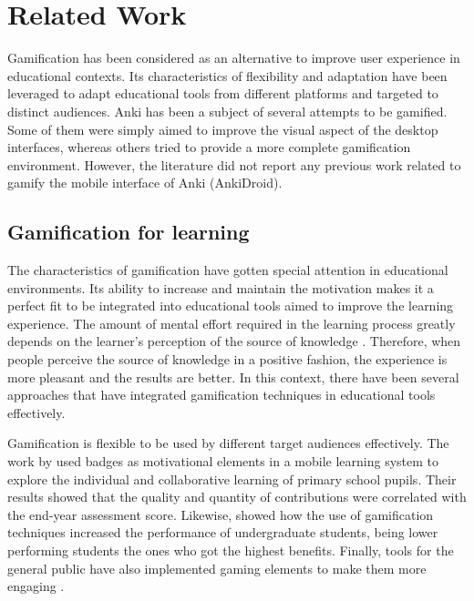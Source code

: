 
\chapter{Related Work} %

\label{rela} %


Gamification has been considered as an alternative to improve user experience in educational contexts. Its characteristics of flexibility and adaptation have been leveraged to adapt educational tools from different platforms and targeted to distinct audiences. Anki has been a subject of several attempts to be gamified. Some of them were simply aimed to improve the visual aspect of the desktop interfaces, whereas others tried to provide a more complete gamification environment. However, the literature did not report any previous work related to gamify the mobile interface of Anki (AnkiDroid).

\section{Gamification for learning}
The characteristics of gamification have gotten special attention in educational environments. Its ability to increase and maintain the motivation makes it a perfect fit to be integrated into educational tools aimed to improve the learning experience. The amount of mental effort required in the learning process greatly depends on the learner's perception of the source of knowledge \citep{salomon1983differential}. Therefore, when people perceive the source of knowledge in a positive fashion, the experience is more pleasant and the results are better. In this context, there have been several approaches that have integrated gamification techniques in educational tools effectively.

Gamification is flexible to be used by different target audiences effectively. The work by \citep{boticki2015usage} used badges as motivational elements in a mobile learning system to explore the individual and collaborative learning of primary school pupils. Their results showed that the quality and quantity of contributions were correlated with the end-year assessment score. Likewise, \citep{slish2015gamification} showed how the use of gamification techniques increased the performance of undergraduate students, being lower performing students the ones who got the highest benefits. Finally, tools for the general public have also implemented gaming elements to make them more engaging \citep{morrison2014khan}.

